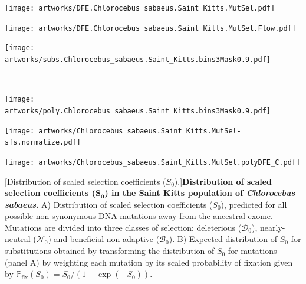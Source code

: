 \documentclass{article}
\newcommand{\proba}{\mathbb{P}}
\newcommand{\Sphy}{S_{0}}
\newcommand{\SphyDel}{\mathcal{D}_0}
\newcommand{\SphyNeu}{\mathcal{N}_0}
\newcommand{\SphyBen}{\mathcal{B}_0}
\begin{document}
    \begin{center}
        \begin{minipage}{0.32\linewidth}
            \texttt{[image: artworks/DFE.Chlorocebus\_sabaeus.Saint\_Kitts.MutSel.pdf]}
        \end{minipage}
        \begin{minipage}{0.32\linewidth}
            \texttt{[image: artworks/DFE.Chlorocebus\_sabaeus.Saint\_Kitts.MutSel.Flow.pdf]}
        \end{minipage}
        \begin{minipage}{0.32\linewidth}
            \texttt{[image: artworks/subs.Chlorocebus\_sabaeus.Saint\_Kitts.bins3Mask0.9.pdf]}
        \end{minipage}
        \\
        \begin{minipage}{0.32\linewidth}
            \texttt{[image: artworks/poly.Chlorocebus\_sabaeus.Saint\_Kitts.bins3Mask0.9.pdf]}
        \end{minipage}
        \begin{minipage}{0.32\linewidth}
            \texttt{[image: artworks/Chlorocebus\_sabaeus.Saint\_Kitts.MutSel-sfs.normalize.pdf]}
        \end{minipage}
        \begin{minipage}{0.32\linewidth}
            \texttt{[image: artworks/Chlorocebus\_sabaeus.Saint\_Kitts.MutSel.polyDFE\_C.pdf]}
        \end{minipage}
        [Distribution of scaled selection coefficients ($\Sphy$).]{\textbf{Distribution of scaled selection coefficients ($\bm{\Sphy}$) in the Saint Kitts population of \textit{Chlorocebus sabaeus}.}
        A) Distribution of scaled selection coefficients ($\Sphy$), predicted for all possible non-synonymous DNA mutations away from the ancestral exome.
        Mutations are divided into three classes of selection: deleterious ($\SphyDel$), nearly-neutral ($\SphyNeu$) and beneficial non-adaptive ($\SphyBen$).
        B) Expected distribution of $\Sphy$ for substitutions obtained by transforming the distribution of $\Sphy$ for mutations (panel A) by weighting each mutation by its scaled probability of fixation given by $\proba_{\text{fix}} (\Sphy) = \Sphy/(1-\exp(-\Sphy))$.
}
\end{center}
\end{document}
